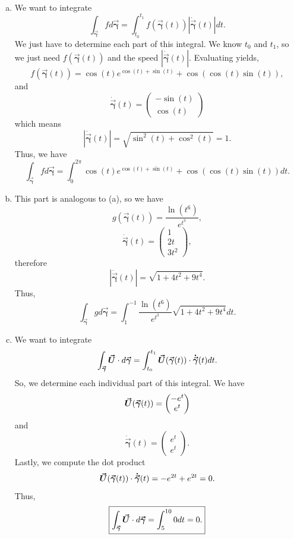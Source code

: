 \documentclass[12pt]{article} %
\newcommand{\curvegamma}{\boldsymbol{\vec{\gamma}}}
\newcommand{\tangentgamma}{\boldsymbol{\dot{\vec{\gamma}}}}
\begin{document}
\begin{solution}~
\begin{enumerate}[(a)]
    \item We want to integrate
    \[
    \int_{\curvegamma} f d\curvegamma = \int_{t_0}^{t_1} f(\curvegamma(t)) \left| \tangentgamma(t) \right| dt.
    \]
    We just have to determine each part of this integral. We know $t_0$ and $t_1$, so we just need $f(\curvegamma(t))$ and the speed $\left|\tangentgamma(t)\right|$. Evaluating yields,
    \[
    f(\curvegamma(t)) = \cos(t)e^{\cos(t)+\sin(t)} + \cos(\cos(t)\sin(t)),
    \]
    and
    \[
    \tangentgamma(t) = \begin{pmatrix} -\sin(t) \\ \cos(t) \end{pmatrix}
    \]
    which means
    \[
    \left| \tangentgamma(t) \right| = \sqrt{\sin^2(t) + \cos^2(t)} = 1.
    \]
    Thus, we have
    \[
    \boxed{\int_{\curvegamma} f d\curvegamma = \int_0^{2\pi} \cos(t)e^{\cos(t)+\sin(t)} + \cos(\cos(t)\sin(t)) dt.}
    \]

    \item This part is analogous to (a), so we have
    \[
    g(\curvegamma(t)) = \frac{\ln(t^6)}{e^{t^3}},
    \]
    \[
    \tangentgamma(t) = \begin{pmatrix} 1 \\ 2t \\ 3t^2 \end{pmatrix},
    \]
    therefore
    \[
    \left| \tangentgamma(t) \right| = \sqrt{1+4t^2+9t^4}.
    \]
    Thus,
    \[
    \boxed{\int_{\curvegamma} g d\curvegamma = \int_{1}^{-1} \frac{\ln(t^6)}{e^{t^3}} \sqrt{1+4t^2+9t^4} dt.}
    \]

    \item We want to integrate
    \[
    \int_{\curvegamma} \vecfieldU \cdot d\curvegamma = \int_{t_0}^{t_1} \vecfieldU(\curvegamma(t)) \cdot \tangentgamma(t) dt.
    \]
    So, we determine each individual part of this integral. We have
    \[
    \vecfieldU(\curvegamma(t)) = \begin{pmatrix} -e^t \\ e^t \end{pmatrix}
    \]
    and
    \[
    \tangentgamma(t) = \begin{pmatrix} e^t \\ e^t \end{pmatrix}.
    \]
    Lastly, we compute the dot product
    \[
    \vecfieldU(\curvegamma(t)) \cdot \tangentgamma(t) = -e^{2t} + e^{2t} = 0.
    \]
    Thus,
    \[
    \boxed{\int_{\curvegamma} \vecfieldU \cdot d\curvegamma = \int_{5}^{10} 0 dt = 0.}
    \]


\end{enumerate}
\end{solution}
\end{document}
